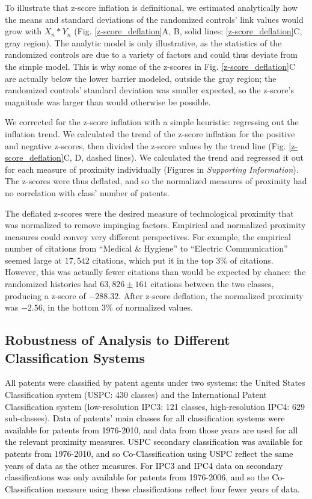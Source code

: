 \documentclass[]{svjour3}
\begin{document}
To illustrate that z-score inflation is definitional, we estimated analytically how the means and standard deviations of the randomized controls' link values would grow with $X_n*Y_n$ (Fig. \ref{z-score_deflation}A, B, solid lines; \ref{z-score_deflation}C, gray region). The analytic model is only illustrative, as the statistics of the randomized controls are due to a variety of factors and could thus deviate from the simple model. This is why some of the z-scores in Fig. \ref{z-score_deflation}C are actually below the lower barrier modeled, outside the gray region; the randomized controls' standard deviation was smaller expected, so the z-score's magnitude was larger than would otherwise be possible.

We corrected for the z-score inflation with a simple heuristic: regressing out the inflation trend. We calculated the trend of the z-score inflation for the positive and negative z-scores, then divided the z-score values by the trend line (Fig. \ref{z-score_deflation}C, D, dashed lines). We calculated the trend and regressed it out for each measure of proximity individually (Figures in \textit{Supporting Information}). The z-scores were thus deflated, and so the normalized measures of proximity had no correlation with class' number of patents.

The deflated z-scores were the desired measure of technological  proximity that was normalized to remove impinging factors. Empirical and normalized proximity measures could convey very different perspectives. For example, the empirical number of citations from ``Medical \& Hygiene'' to ``Electric Communication'' seemed large at $17,542$ citations, which put it in the top 3\% of citations. However, this was actually fewer citations than would be expected by chance: the randomized histories had $63,826 \pm 161$ citations between the two classes, producing a z-score of $-288.32$. After z-score deflation, the normalized proximity was $-2.56$, in the bottom 3\% of normalized values.


\subsection{Robustness of Analysis to Different Classification Systems}
All patents were classified by patent agents under two systems: the United States Classification system (USPC: 430 classes) and the International Patent Classification system (low-resolution IPC3: 121 classes, high-resolution IPC4: 629 sub-classes). \textcolor{black}{Data of patents' main classes for all classification systems were available for patents from 1976-2010, and data from those years are used for all the relevant proximity measures. USPC secondary classification was available for patents from 1976-2010, and so Co-Classification using USPC reflect the same years of data as the other measures. For IPC3 and IPC4 data on secondary classifications was only available for patents from 1976-2006, and so the Co-Classification measure using these classifications reflect four fewer years of data.}
\end{document}
